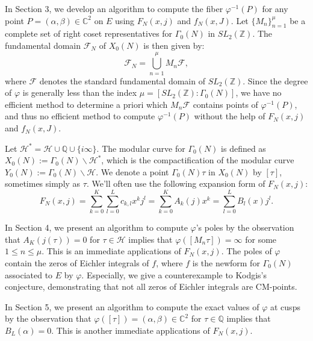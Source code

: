 \documentclass[10pt, a4paper]{article}
\begin{document}
In Section 3, we develop an algorithm to compute the fiber \(\varphi^{-1}(P)\) for any point \( P = (\alpha, \beta) \in \mathbb{C}^2 \) on $E$
using \( F_N(x, j) \) and \( f_N(x, J) \).
Let \(\{M_n\}_{n=1}^{\mu}\) be a complete set of right coset representatives for \(\Gamma_0(N)\) in \(SL_2(\mathbb{Z})\). The fundamental domain $\mathcal{F}_N$ of \(X_0(N)\) is then given by:
\[
\mathcal{F}_N = \bigcup_{n=1}^{\mu} M_n \mathcal{F},
\]
where \(\mathcal{F}\) denotes the standard fundamental domain of \(SL_2(\mathbb{Z})\).
 Since the degree of \(\varphi\) is generally less than the index \(\mu = [SL_2(\mathbb{Z}) : \Gamma_0(N)]\), we have no efficient method to determine a priori which \(M_n\mathcal{F}\) contains points of \(\varphi^{-1}(P)\), and thus no efficient method to compute \(\varphi^{-1}(P)\) without the help of \( F_N(x, j) \) and \( f_N(x, J) \).

Let \( \mathcal{H}^* = \mathcal{H} \cup \mathbb{Q} \cup \{i\infty\} \).  The modular curve for  $\Gamma_0(N)$ is  defined as \( X_0(N) := \Gamma_0(N) \backslash \mathcal{H}^* \),  which is the compactification of  the modular curve  $Y_0(N):= \Gamma_0(N) \backslash \mathcal{H}$.
We denote a point \( \Gamma_0(N)\tau \) in \( X_0(N) \) by \( [\tau] \), sometimes simply as \( \tau \).
We'll  often use  the following expansion form of  $F_N(x,j) $:
\begin{equation}
F_N(x, j)= \sum_{k=0}^K \sum_{l=0}^L c_{k,l} x^k j^l= \sum_{k=0}^K A_k(j)x^k = \sum_{l=0}^L B_l(x)j^l.
\end{equation}

In Section 4, we present an algorithm to compute \( \varphi \)'s poles by  the observation that
$A_K(j(\tau)) = 0$  for $\tau\in \mathcal{H}$ implies that  $ \varphi([M_n\tau]) = \infty$ for some $1 \leqslant n \leqslant \mu$.  This  is an immediate applications of \( F_N(x,j) \).  The poles of  $\varphi$ contain the zeros of Eichler integrals of $f$,  where $f$ is the newform for ${\Gamma _0}(N)$  associated to $E$ by $\varphi$.
Especially,  we give a counterexample to Kodgis's conjecture\cite{Kodgis,Peluse}, demonstrating that not all zeros of Eichler integrals are CM-points.

In Section 5, we present an algorithm to compute the exact values of \( \varphi \)
 at cusps by  the observation that  $\varphi([\tau])=(\alpha ,\beta ) \in {\mathbb{C}^2} $ for $ \tau \in  \mathbb{Q}$
implies that $B_L(\alpha) = 0$.
This is another  immediate applications of \( F_N(x,j) \).
\end{document}
